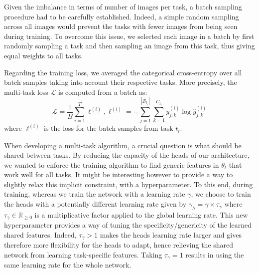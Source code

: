 Given the imbalance in terms of number of images per task, a batch sampling procedure had to be carefully established. Indeed, a simple random sampling across all images would prevent the tasks with fewer images from being seen during training. To overcome this issue, we selected each image in a batch by first randomly sampling a task and then sampling an image from this task, thus giving equal weights to all tasks.

Regarding the training loss, we averaged the categorical cross-entropy over all batch samples taking into account their respective tasks. More precisely, the multi-task loss $\mathcal{L}$ is computed from a batch as:
\begin{equation}\label{eqn:loss}
\mathcal{L} = \frac{1}{B} \sum_{i=1}^T \ell^{(i)}, \ell^{(i)} = - \sum_{j=1}^{\left|\mathcal{B}_{t_i}\right|} \sum_{k=1}^{C_{t_i}} y^{(i)}_{j,k} \log \hat{y}^{(i)}_{j,k}
\end{equation}
where $\ell^{(i)}$ is the loss for the batch samples from task $t_i$.

When developing a multi-task algorithm, a crucial question is what should be shared between tasks. By reducing the capacity of the heads of our architecture, we wanted to enforce the training algorithm to find generic features in $\theta_t$ that work well for all tasks. It might be interesting however to provide a way to slightly relax this implicit constraint, with a hyperparameter. To this end, during training, whereas we train the network with a learning rate $\gamma$, we choose to train the heads with a potentially different learning rate given by $\gamma_h = \gamma \times \tau_\gamma$ where $\tau_\gamma \in \mathbb{R}_{\geq0}$ is a multiplicative factor applied to the global learning rate. This new hyperparameter provides a way of tuning the specificity/genericity of the learned shared features.  Indeed, $\tau_\gamma > 1$ makes the heads learning rate larger and gives therefore more flexibility for the heads to adapt, hence relieving the shared network from learning task-specific features. Taking $\tau_\gamma = 1$ results in using the same learning rate for the whole network.

